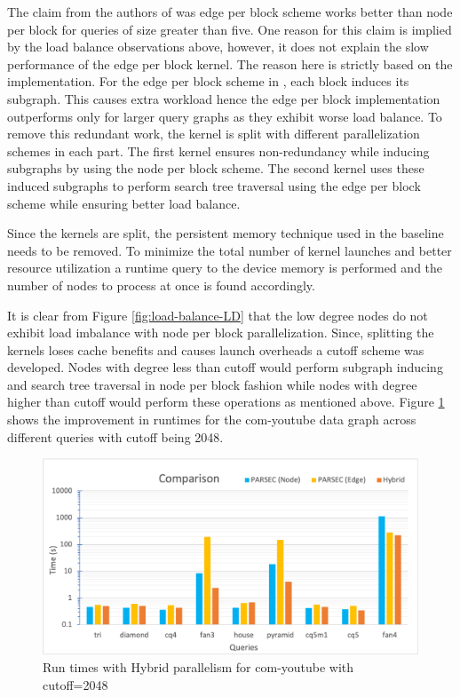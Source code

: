 {The claim from the authors of \cite{PARSEC_VD} was edge per block scheme works better than node per block for queries of size greater than five.
One reason for this claim is implied by the load balance observations above, however, it does not explain the slow performance of the edge per block kernel.
The reason here is strictly based on the implementation. For the edge per block scheme in \cite{PARSEC_VD}, each block induces its subgraph. This causes extra workload hence the edge per block implementation outperforms only for larger query graphs as they exhibit worse load balance.
To remove this redundant work, the kernel is split with different parallelization schemes in each part.
The first kernel ensures non-redundancy while inducing subgraphs by using the node per block scheme.
The second kernel uses these induced subgraphs to perform search tree traversal using the edge per block scheme while ensuring better load balance.

Since the kernels are split, the persistent memory technique used in the baseline \cite{PARSEC_VD} needs to be removed.
To minimize the total number of kernel launches and better resource utilization a runtime query to the device memory is performed and the number of nodes to process at once is found accordingly.

It is clear from Figure \ref{fig:load-balance-LD} that the low degree nodes do not exhibit load imbalance with node per block parallelization. Since, splitting the kernels loses cache benefits and causes launch overheads a cutoff scheme was developed. Nodes with degree less than cutoff would perform subgraph inducing and search tree traversal in node per block fashion while nodes with degree higher than cutoff would perform these operations as mentioned above.
Figure \ref{fig:hybrid-par-speedups} shows the improvement in runtimes for the com-youtube data graph across different queries with cutoff being 2048.

\begin{figure}
    \includegraphics[width=\textwidth]{fig/improvements/Hybrid-parallelism-speedups.png}
    \caption{Run times with Hybrid parallelism for com-youtube with cutoff=2048 }
    \label{fig:hybrid-par-speedups}
\end{figure}

}
